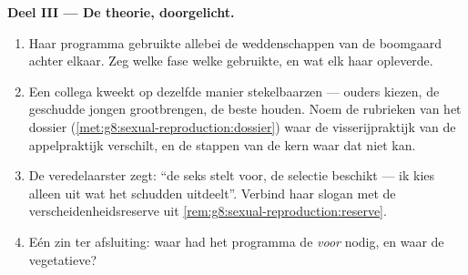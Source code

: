 \begin{problem}
\medskip\noindent\textbf{Deel III --- De theorie,
doorgelicht.}
\begin{enumerate}[resume]
  \item Haar programma gebruikte allebei de weddenschappen van de
        boomgaard achter elkaar. Zeg welke fase welke gebruikte, en wat
        elk haar opleverde.
  \item Een collega kweekt op dezelfde manier stekelbaarzen --- ouders
        kiezen, de geschudde jongen grootbrengen, de beste houden. Noem de
        rubrieken van het dossier (\cref{met:g8:sexual-reproduction:dossier})
        waar de visserijpraktijk van de appelpraktijk verschilt, en de
        stappen van de kern waar dat niet kan.
  \item De veredelaarster zegt: ``de seks stelt voor, de selectie
        beschikt --- ik kies alleen uit wat het schudden uitdeelt''.
        Verbind haar slogan met de verscheidenheidsreserve uit
        \cref{rem:g8:sexual-reproduction:reserve}.
  \item Eén zin ter afsluiting: waar had het programma de  \emph{voor} nodig, en waar de vegetatieve?
\end{enumerate}
\end{problem}
